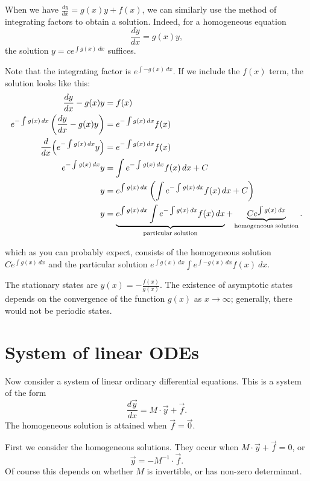 \documentclass[a4paper, 12pt,oneside,openany]{book}
\begin{document}

 When we have $\frac{dy}{dx}=g(x)y+f(x)$, we can similarly use the method of integrating factors to obtain a solution. Indeed, for a homogeneous equation $$\frac{dy}{dx} = g(x) y,$$ the solution $y=ce^{\int g(x)\ dx}$ suffices.

Note that the integrating factor is $e^{\int -g(x)\ dx}$. If we include the $f(x)$ term, the solution looks like this:
\begin{align*}
\frac{dy}{dx} - g(x)y &= f(x) \\
e^{-\int g(x)\,dx}\left(\frac{dy}{dx} - g(x)y\right) &= e^{-\int g(x)\,dx}f(x) \\
\frac{d}{dx}\Bigl(e^{-\int g(x)\,dx}y\Bigr) &= e^{-\int g(x)\,dx}f(x) \\
e^{-\int g(x)\,dx}y &= \int e^{-\int g(x)\,dx}f(x)\,dx + C \\
y &= e^{\int g(x)\,dx}\left(\int e^{-\int g(x)\,dx}f(x)\,dx + C\right) \\
y &= \underbrace{e^{\int g(x)\,dx}\int e^{-\int g(x)\,dx}f(x)\,dx}_{\text{particular solution}}
    + \underbrace{Ce^{\int g(x)\,dx}}_{\text{homogeneous solution}}.
\end{align*}

which as you can probably expect, consists of the homogeneous solution $Ce^{\int g(x)\ dx}$ and the particular solution $e^{\int g(x)\ dx} \int e^{\int -g(x)\ dx} f(x) \ dx$. 

The stationary states are $y(x) = -\frac{f(x)}{g(x)}$. The existence of asymptotic states depends on the convergence of the function $g(x)$ as $x \to \infty$; generally, there would not be periodic states.

\section{System of linear ODEs}

Now consider a system of linear ordinary differential equations. This is a system of the form $$\frac{d\vec{y}}{dx} = M \cdot \vec{y} + \vec{f}.$$ The homogeneous solution is attained when $\vec{f}=\vec{0}$. 

First we consider the homogeneous solutions. They occur when $M \cdot \vec{y} + \vec{f}=0$, or $$\vec{y} = -M^{-1} \cdot \vec{f}.$$ Of course this depends on whether $M$ is invertible, or has non-zero determinant. 
\end{document}

